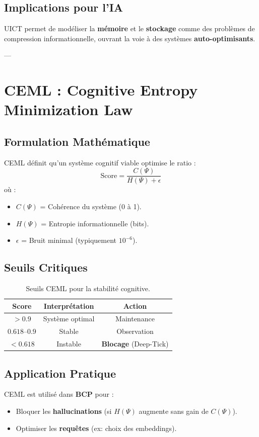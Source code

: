 \documentclass{article}
\begin{document}
\subsection{Implications pour l’IA}
UICT permet de modéliser la \textbf{mémoire} et le \textbf{stockage} comme des problèmes de compression informationnelle, ouvrant la voie à des systèmes \textbf{auto-optimisants}.

---

\section{CEML : Cognitive Entropy Minimization Law}
\subsection{Formulation Mathématique}
CEML définit qu’un système cognitif viable optimise le ratio :
\begin{equation}
    \text{Score} = \frac{C(\Psi)}{H(\Psi) + \epsilon}
\end{equation}
où :
\begin{itemize}
    \item $C(\Psi)$ = Cohérence du système (0 à 1).
    \item $H(\Psi)$ = Entropie informationnelle (bits).
    \item $\epsilon$ = Bruit minimal (typiquement $10^{-6}$).
\end{itemize}

\subsection{Seuils Critiques}
\begin{table}[h]
\centering
\begin{tabular}{|c|c|c|}
\hline
\textbf{Score} & \textbf{Interprétation} & \textbf{Action} \\
\hline
$> 0.9$ & Système optimal & Maintenance \\
\hline
$0.618$–$0.9$ & Stable & Observation \\
\hline
$< 0.618$ & Instable & \textbf{Blocage} (Deep-Tick) \\
\hline
\end{tabular}
\caption{Seuils CEML pour la stabilité cognitive.}
\end{table}

\subsection{Application Pratique}
CEML est utilisé dans \textbf{BCP} pour :
\begin{itemize}
    \item Bloquer les \textbf{hallucinations} (si $H(\Psi)$ augmente sans gain de $C(\Psi)$).
    \item Optimiser les \textbf{requêtes} (ex: choix des embeddings).
\end{itemize}
\end{document}
